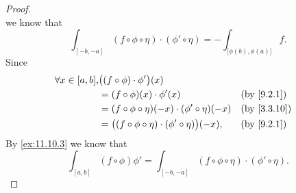 \begin{proof}
\[  \]
  we know that
  \[
    \int_{[-b, -a]} (f \circ \phi \circ \eta) \cdot (\phi' \circ \eta) = -\int_{\big[\phi(b), \phi(a)\big]} f.
  \]
  Since
  \begin{align*}
    \forall x \in [a, b], & \big((f \circ \phi) \cdot \phi'\big)(x)                                              \\
                          & = (f \circ \phi)(x) \cdot \phi'(x)                                  &  & \by{9.2.1}  \\
                          & = (f \circ \phi \circ \eta)(-x) \cdot (\phi' \circ \eta)(-x)        &  & \by{3.3.10} \\
                          & = \big((f \circ \phi \circ \eta) \cdot (\phi' \circ \eta)\big)(-x), &  & \by{9.2.1}
  \end{align*}
  By \cref{ex:11.10.3} we know that
  \[
    \int_{[a, b]} (f \circ \phi) \phi' = \int_{[-b, -a]} (f \circ \phi \circ \eta) \cdot (\phi' \circ \eta).
  \]
\end{proof}